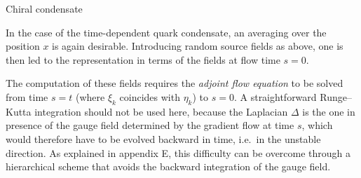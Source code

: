  Chiral condensate

In the case of the time-dependent quark condensate,
an averaging over the position $x$ is again desirable. 
Introducing random source fields as above, one is then
led to the representation
in terms of the fields
at flow time $s=0$. 

The computation of these fields requires 
the {\it adjoint flow equation}
to be solved from time $s=t$ (where $\xi_k$ coincides
with $\eta_k$) to $s=0$. A straightforward Runge--Kutta
integration should not be used here, because
the Laplacian $\Delta$ is the one in presence
of the gauge field determined by the gradient flow at time $s$,
which would therefore have to be evolved backward in time,
i.e.~in the unstable direction.
As explained in appendix E, this difficulty can be overcome
through a hierarchical scheme that avoids the backward integration
of the gauge field.

